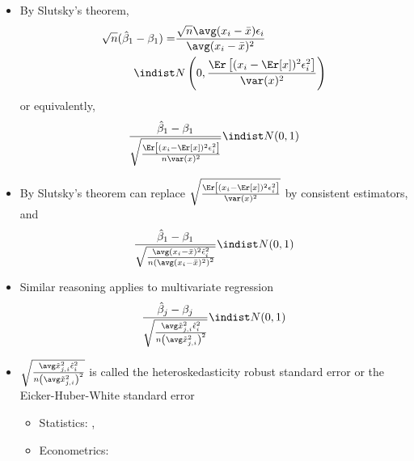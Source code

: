 \begin{frame}[allowframebreaks]
\begin{itemize}
\begin{itemize}
\begin{itemize}
        exists
      \end{itemize}
      then $\frac{1}{\sqrt{n}} \sumin (x_i-\Er[x]) \epsilon_i
      \indist N\left(0, \Er\left[(x_i-\Er[x])^2 \epsilon_i^2\right] \right)$
    \item Can conclude that
      \[ \frac{1}{\sqrt{n}} \sumin (x_i-\bar{x})\epsilon_i \indist
      N\left(0, \Er\left[(x_i-\Er[x])^2 \epsilon_i^2\right]  \right) \]
    \end{itemize}
  \item By Slutsky's theorem,
    \begin{align*}
      \sqrt{n}(\hat{\beta}_1 - \beta_1) = & \frac{\sqrt{n} \avg (x_i-\bar{x}) \epsilon_i} {\avg (x_i -
        \bar{x})^2} \\
      \indist & N\left(0, \frac{\Er\left[ (x_i-\Er[x])^2
            \epsilon_i^2 \right]}{\var(x)^2} \right)
    \end{align*}
    or equivalently,
    \[ \frac{\hat{\beta}_1 - \beta_1} {
      \sqrt{\frac{\Er\left[ (x_i-\Er[x])^2
            \epsilon_i^2 \right]}{n \var(x)^2} } } \indist N(0,1) \]    
  \item By Slutsky's theorem can replace $\sqrt{\frac{\Er\left[
          (x_i - \Er[x])^2 \epsilon_i^2 \right]}{\var(x)^2} }$ by
    consistent estimators, and
    \begin{align*}
      \frac{\hat{\beta}_1 - \beta_1}
      { \sqrt{\frac{\avg (x_i-\bar{x})^2 \hat{\epsilon}_i^2 }
      {n \left(\avg (x_i - \bar{x})^2\right)^2 }}} \indist N(0,1) 
    \end{align*}
  \item Similar reasoning applies to multivariate regression
    \begin{align*}
      \frac{\hat{\beta}_j - \beta_j}
      { \sqrt{\frac{\avg \tilde{x}_{j,i}^2
            \hat{\epsilon}_i^2}{n \left(\avg \tilde{x}_{j,i}^2\right)^2
          }}} \indist N(0,1)  
    \end{align*}    
  \item $\sqrt{\frac{\avg \tilde{x}_{j,i}^2
        \hat{\epsilon}_i^2}{n \left(\avg
          \tilde{x}_{j,i}^2\right)^2}}$ is called the
    heteroskedasticity robust standard error or the
    Eicker-Huber-White standard error 
    \begin{itemize}
    \item Statistics: \cite{eicker1967}, \cite{huber1967}
    \item Econometrics: \cite{white1980}
    \end{itemize}    
  \end{itemize}
\end{frame}



